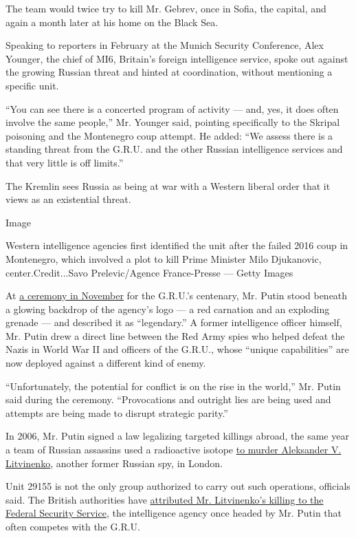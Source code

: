 The team would twice try to kill Mr. Gebrev, once in Sofia, the capital,
and again a month later at his home on the Black Sea.

Speaking to reporters in February at the Munich Security Conference,
Alex Younger, the chief of MI6, Britain's foreign intelligence service,
spoke out against the growing Russian threat and hinted at coordination,
without mentioning a specific unit.

``You can see there is a concerted program of activity --- and, yes, it
does often involve the same people,'' Mr. Younger said, pointing
specifically to the Skripal poisoning and the Montenegro coup attempt.
He added: ``We assess there is a standing threat from the G.R.U. and the
other Russian intelligence services and that very little is off
limits.''

The Kremlin sees Russia as being at war with a Western liberal order
that it views as an existential threat.

Image

Western intelligence agencies first identified the unit after the failed
2016 coup in Montenegro, which involved a plot to kill Prime Minister
Milo Djukanovic, center.Credit...Savo Prelevic/Agence France-Presse ---
Getty Images

At \href{https://www.vesti.ru/doc.html?id=3079058}{a ceremony in
November} for the G.R.U.'s centenary, Mr. Putin stood beneath a glowing
backdrop of the agency's logo --- a red carnation and an exploding
grenade --- and described it as ``legendary.'' A former intelligence
officer himself, Mr. Putin drew a direct line between the Red Army spies
who helped defeat the Nazis in World War II and officers of the G.R.U.,
whose ``unique capabilities'' are now deployed against a different kind
of enemy.

``Unfortunately, the potential for conflict is on the rise in the
world,'' Mr. Putin said during the ceremony. ``Provocations and outright
lies are being used and attempts are being made to disrupt strategic
parity.''

In 2006, Mr. Putin signed a law legalizing targeted killings abroad, the
same year a team of Russian assassins used a radioactive isotope
\href{https://www.nytimes.com/2006/12/03/world/europe/03russian.html}{to
murder Aleksander V. Litvinenko}, another former Russian spy, in London.

Unit 29155 is not the only group authorized to carry out such
operations, officials said. The British authorities have
\href{https://www.nytimes.com/2016/01/22/world/europe/alexander-litvinenko-poisoning-inquiry-britain.html}{attributed
Mr. Litvinenko's killing to the Federal Security Service}, the
intelligence agency once headed by Mr. Putin that often competes with
the G.R.U.


